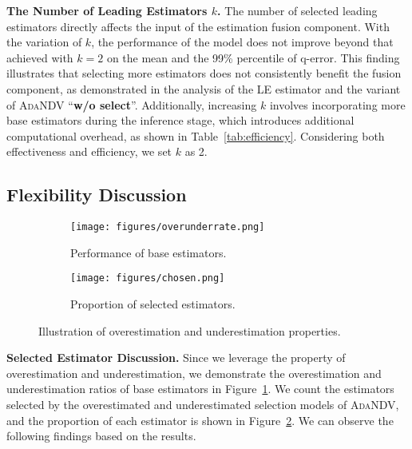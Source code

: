 \noindent\textbf{The Number of Leading Estimators $k$.} The number of selected leading estimators directly affects the input of the estimation fusion component. With the variation of $k$, the performance of the model does not improve beyond that achieved with $k=2$ on the mean and the 99\% percentile of q-error. This finding illustrates that selecting more estimators does not consistently benefit the fusion component, as demonstrated in the analysis of the LE estimator and the variant of \textsc{AdaNDV} ``\textbf{{w/o} select}''. Additionally, increasing $k$ involves incorporating more base estimators during the inference stage, which introduces additional computational overhead, as shown in Table~\ref{tab:efficiency}. Considering both effectiveness and efficiency, we set $k$ as 2.



\subsection{Flexibility Discussion}
\label{sec:exp-paradigm}


\begin{figure}[t]
    \centering
    \begin{subfigure}{0.23\textwidth}
         \centering
         \texttt{[image: figures/overunderrate.png]}
         \caption{{Performance of base estimators.}}\label{fig:baseratio}
     \end{subfigure}
     \begin{subfigure}{0.23\textwidth}
         \centering
         \texttt{[image: figures/chosen.png]}
         \caption{Proportion of selected estimators.}\label{fig:chosen}
     \end{subfigure}
     \caption{{Illustration of overestimation and underestimation properties.}}\label{fig:overunderproperty}
\end{figure}

\noindent\textbf{Selected Estimator Discussion.} 
{Since we leverage the property of overestimation and underestimation, we demonstrate the overestimation and underestimation ratios of base estimators in Figure~\ref{fig:baseratio}.} We count the estimators selected by the overestimated and underestimated selection models of \textsc{AdaNDV}, and the proportion of each estimator is shown in Figure~\ref{fig:chosen}. We can observe the following findings based on the results.

